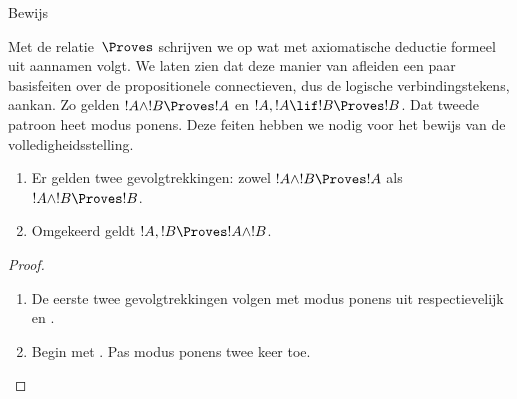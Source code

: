 \documentclass[openany]{memoir}
\begin{document}
\begin{prob}
  Bewijs 
\end{prob}
\tagendprob
\endgroup

\begingroup
\def\olfilename{OLP-0122}
\def\olfilepath{content/first-order-logic/axiomatic-deduction/}
\hypertarget{unit-OLP-0122}{}



      {}
      {}


\begin{explain}
  Met de relatie~$\Proves$ schrijven we op wat met axiomatische
  deductie formeel uit aannamen volgt. We laten zien dat deze manier
  van afleiden een paar basisfeiten over de propositionele
  connectieven, dus de logische verbindingstekens, aankan. Zo gelden
  $!A \land !B \Proves !A$ en $!A, !A \lif !B \Proves !B$. Dat tweede
  patroon heet modus ponens. Deze feiten hebben we nodig voor het
  bewijs van de volledigheidsstelling.
\end{explain}

\begin{prop}
  \begin{enumerate}
  \item {} Er gelden twee
    gevolgtrekkingen: zowel $!A \land !B \Proves !A$ als
    $!A \land !B \Proves !B$.
  \item {} Omgekeerd geldt
    $!A, !B \Proves !A \land !B$.
  \end{enumerate}
\end{prop}

\begin{proof}
  \begin{enumerate}
    \item De eerste twee gevolgtrekkingen volgen met modus ponens uit
      respectievelijk  en
      .
  \item Begin met . Pas modus ponens twee keer
    toe.
  \end{enumerate}
\end{proof}
\end{document}
